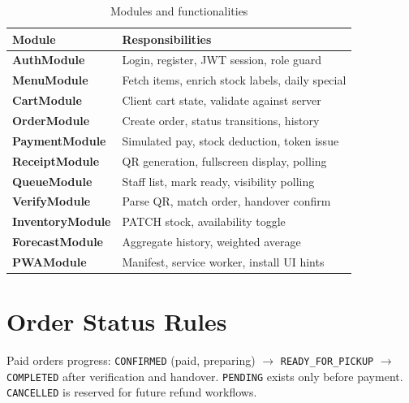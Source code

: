 \begin{table}[H]
  \centering
  \caption{Modules and functionalities}
  \label{tab:modules}
  \tablebodysetup
  \begin{tabularx}{\textwidth}{@{}>{\bfseries}p{} Y@{}}
    \toprule
    \textbf{Module} & \textbf{Responsibilities} \\
    \midrule
    AuthModule & Login, register, JWT session, role guard \\
    MenuModule & Fetch items, enrich stock labels, daily special \\
    CartModule & Client cart state, validate against server \\
    OrderModule & Create order, status transitions, history \\
    PaymentModule & Simulated pay, stock deduction, token issue \\
    ReceiptModule & QR generation, fullscreen display, polling \\
    QueueModule & Staff list, mark ready, visibility polling \\
    VerifyModule & Parse QR, match order, handover confirm \\
    InventoryModule & PATCH stock, availability toggle \\
    ForecastModule & Aggregate history, weighted average \\
    PWAModule & Manifest, service worker, install UI hints \\
    \bottomrule
  \end{tabularx}
\end{table}

\section{Order Status Rules}
Paid orders progress: \texttt{CONFIRMED} (paid, preparing) $\rightarrow$ \texttt{READY\_FOR\_PICKUP} $\rightarrow$ \texttt{COMPLETED} after verification and handover. \texttt{PENDING} exists only before payment. \texttt{CANCELLED} is reserved for future refund workflows.
